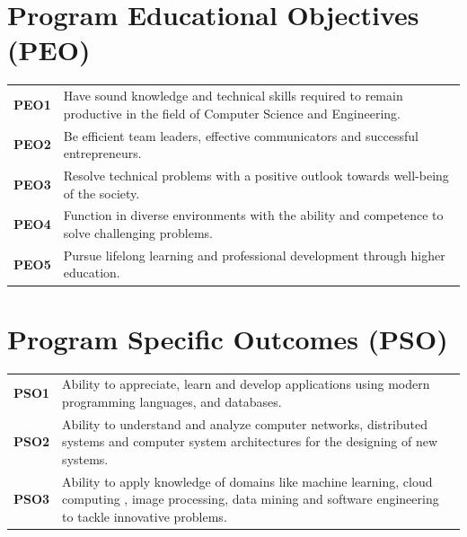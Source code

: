 \documentclass[twoside,a4paper,openright]{report} %
\begin{document}
\chapter*{\centering \large Program Educational Objectives (PEO)}
\begin{table}[ht]
    \centering
    \begin{tabular}{p{2cm} p{13cm}}
    \textbf{PEO1}\;& Have sound knowledge and technical skills required to remain productive in the field of Computer Science and Engineering. \\
    \textbf {PEO2} \;&  Be efficient team leaders, effective communicators and successful entrepreneurs.  \\
    \textbf {PEO3}\; & Resolve technical problems with a positive outlook towards well-being of the society. \\
    \textbf {PEO4}\; & Function in diverse environments with the ability and competence to solve challenging problems. \\
    \textbf {PEO5}\; & Pursue lifelong learning and professional development through higher education. \\
 \end{tabular}
 \label{tab:my_label}
\end{table}

\thispagestyle{empty}
\newpage
\newpage
\chapter*{\centering \large Program Specific Outcomes (PSO)}
\begin{table}[ht]
    \centering
    \begin{tabular}{p{2cm} p{13cm}}
    \textbf {PSO1}\; &Ability to appreciate, learn and develop applications using modern programming languages, and databases. \\
    \textbf {PSO2}\; & Ability to understand and analyze computer networks, distributed systems and computer system architectures for the designing of new systems.  \\
    \textbf {PSO3}\; & Ability to apply knowledge of domains like machine learning, cloud computing , image processing, data mining and software engineering to tackle innovative problems.  \\
 \end{tabular}
 \label{tab:pso_label}
\end{table}


\thispagestyle{empty}
\newpage
\mbox{~}
\newpage
\end{document}
